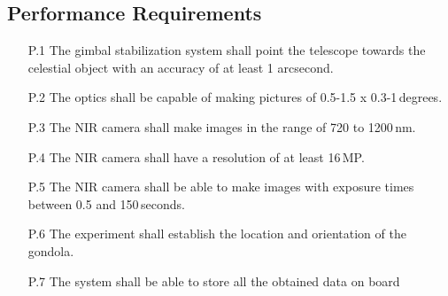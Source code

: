 \subsection{Performance Requirements}

\begin{enumerate}
    \item[P.1] The gimbal stabilization system shall point the telescope towards the celestial object with an accuracy of at least 1 arcsecond.
    \item[P.2] The optics shall be capable of making pictures of 0.5-1.5 x 0.3-1\,degrees.
    \item[P.3] The NIR camera shall make images in the range of 720 to 1200\,nm.
    \item[P.4] The NIR camera shall have a resolution of at least 16\,MP.
    \item[P.5] The NIR camera shall be able to make images with exposure times between 0.5 and 150\,seconds.
    \item[P.6] The experiment shall establish the location and orientation of the gondola.
    \item[P.7] The system shall be able to store all the obtained data on board

\end{enumerate}
